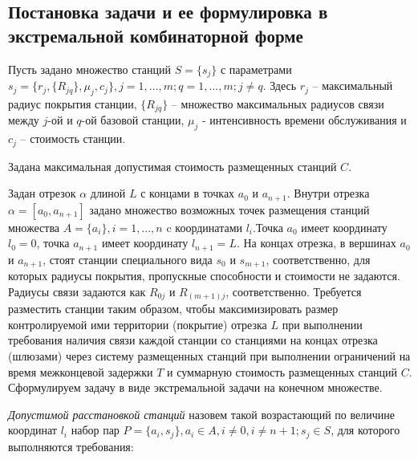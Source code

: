 \subsection{Постановка задачи и ее формулировка в экстремальной комбинаторной форме}

Пусть задано множество станций $S=\{s_j\}$ с параметрами $s_j=\{r_j,\{R_{jq} \},\mu_j, c_j \},j=1,...,m;q=1,...,m;j \neq q $. Здесь $r_j$ -- максимальный радиус покрытия станции, $\{R_{jq} \}$ -- множество максимальных радиусов связи между $j$-ой и $q$-ой базовой станции, $\mu_j$ - интенсивность времени обслуживания и $c_j$ -- стоимость станции.

Задана максимальная допустимая стоимость размещенных станций $C$. 


Задан отрезок $\alpha$ длиной $L$ с концами в точках $a_0$ и $a_{n+1}$. Внутри отрезка $\alpha = [a_0, a_{n+1}]$ задано множество возможных точек размещения станций множества $A=\{a_i \},i=1,...,n$ c координатами $l_i$.Точка $a_0$ имеет координату $l_0=0$, точка $a_{n+1}$ имеет координату $l_{n+1}=L$. На концах отрезка, в вершинах $a_0$ и $a_{n+1}$, стоят станции специального вида $s_0$ и $s_{m+1}$, соответственно, для которых радиусы покрытия, пропускные способности и стоимости не задаются. Радиусы связи задаются как $R_{0j}$ и $R_{(m+1)j}$, соответственно.
Требуется разместить станции таким образом, чтобы максимизировать размер контролируемой ими территории (покрытие) отрезка $L$ при выполнении требования наличия связи каждой станции со станциями на концах отрезка (шлюзами) через систему размещенных станций при выполнении ограничений на время межконцевой задержки $T$ и суммарную стоимость размещенных станций $C$.
Сформулируем задачу в виде экстремальной задачи на конечном множестве.

\textit{Допустимой расстановкой станций} назовем такой возрастающий по величине координат $l_i$  набор пар $P = \{a_i, s_j\},a_i \in A,i \neq 0,i \neq n+1;s_j \in S$, для которого выполняются требования:

